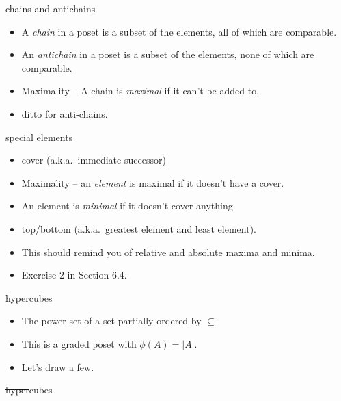 \documentclass[handout,landscape]{beamer}
\begin{document}
\begin{frame}{chains and antichains}
\begin{itemize}
\item A \emph{chain} in a poset is a subset of the elements, all 
of which are comparable. \pause
\item An {\em antichain} in a poset is a subset
of the elements, none of which are comparable.\pause
\item Maximality -- A chain is {\em maximal} if it can't be added to. \pause
\item ditto for anti-chains.
\end{itemize}
\end{frame}

\begin{frame}{special elements}
\begin{itemize}
\item cover \pause (a.k.a.\ immediate successor) \pause
\item Maximality -- an {\em element} is maximal if it doesn't have a cover.\pause
\item An element is {\em minimal} if it doesn't cover anything.\pause
\item top/bottom \pause (a.k.a.\ greatest element and least element). \pause
\item This should remind you of relative and absolute maxima and minima. \pause
\item Exercise 2 in Section 6.4.
\end{itemize}
\end{frame}

\begin{frame}{hypercubes}
\begin{itemize}
\item The power set of a set partially ordered by $\subseteq$ \pause
\item This is a graded poset with $\phi(A) = |A|$.
\item Let's draw a few.
\end{itemize}
\end{frame}

\begin{frame}{\sout{hyper}cubes}



\end{frame}


{ %
\begin{frame}[plain]
\rule{0pt}{0pt}
\end{frame} 
} %
\end{document}
